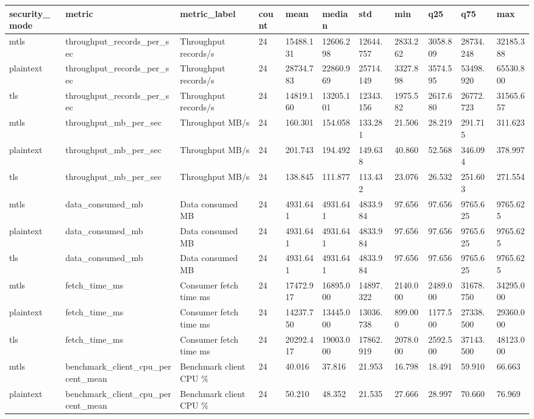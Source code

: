 \begin{tabular}{lllllllllll}
\hline
security\_mode & metric & metric\_label & count & mean & median & std & min & q25 & q75 & max \\
\hline
mtls & throughput\_records\_per\_sec & Throughput records/s & 24 & 15488.131 & 12606.298 & 12644.757 & 2833.262 & 3058.809 & 28734.248 & 32185.388 \\
plaintext & throughput\_records\_per\_sec & Throughput records/s & 24 & 28734.783 & 22860.969 & 25714.149 & 3327.898 & 3574.595 & 53498.920 & 65530.800 \\
tls & throughput\_records\_per\_sec & Throughput records/s & 24 & 14819.160 & 13205.101 & 12343.156 & 1975.582 & 2617.680 & 26772.723 & 31565.657 \\
mtls & throughput\_mb\_per\_sec & Throughput MB/s & 24 & 160.301 & 154.058 & 133.281 & 21.506 & 28.219 & 291.715 & 311.623 \\
plaintext & throughput\_mb\_per\_sec & Throughput MB/s & 24 & 201.743 & 194.492 & 149.638 & 40.860 & 52.568 & 346.094 & 378.997 \\
tls & throughput\_mb\_per\_sec & Throughput MB/s & 24 & 138.845 & 111.877 & 113.432 & 23.076 & 26.532 & 251.603 & 271.554 \\
mtls & data\_consumed\_mb & Data consumed MB & 24 & 4931.641 & 4931.641 & 4833.984 & 97.656 & 97.656 & 9765.625 & 9765.625 \\
plaintext & data\_consumed\_mb & Data consumed MB & 24 & 4931.641 & 4931.641 & 4833.984 & 97.656 & 97.656 & 9765.625 & 9765.625 \\
tls & data\_consumed\_mb & Data consumed MB & 24 & 4931.641 & 4931.641 & 4833.984 & 97.656 & 97.656 & 9765.625 & 9765.625 \\
mtls & fetch\_time\_ms & Consumer fetch time ms & 24 & 17472.917 & 16895.000 & 14897.322 & 2140.000 & 2489.000 & 31678.750 & 34295.000 \\
plaintext & fetch\_time\_ms & Consumer fetch time ms & 24 & 14237.750 & 13445.000 & 13036.738 & 899.000 & 1177.500 & 27338.500 & 29360.000 \\
tls & fetch\_time\_ms & Consumer fetch time ms & 24 & 20292.417 & 19003.000 & 17862.919 & 2078.000 & 2592.500 & 37143.500 & 48123.000 \\
mtls & benchmark\_client\_cpu\_percent\_mean & Benchmark client CPU \% & 24 & 40.016 & 37.816 & 21.953 & 16.798 & 18.491 & 59.910 & 66.663 \\
plaintext & benchmark\_client\_cpu\_percent\_mean & Benchmark client CPU \% & 24 & 50.210 & 48.352 & 21.535 & 27.666 & 28.997 & 70.660 & 76.969 \\

\end{tabular}
